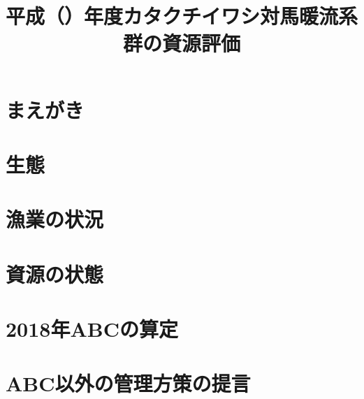 \documentclass{jsarticle}
\title{平成\ThisYrJP（\ThisYr）年度カタクチイワシ対馬暖流系群の資源評価}
\author{}
\date{}
\newcommand{\ThisYr}{2018}
\begin{document}
\maketitle
\section{まえがき}
\section{生態}
\section{漁業の状況}
\section{資源の状態}
\section{\ThisYr 年ABCの算定}
\section{ABC以外の管理方策の提言}
\end{document}
